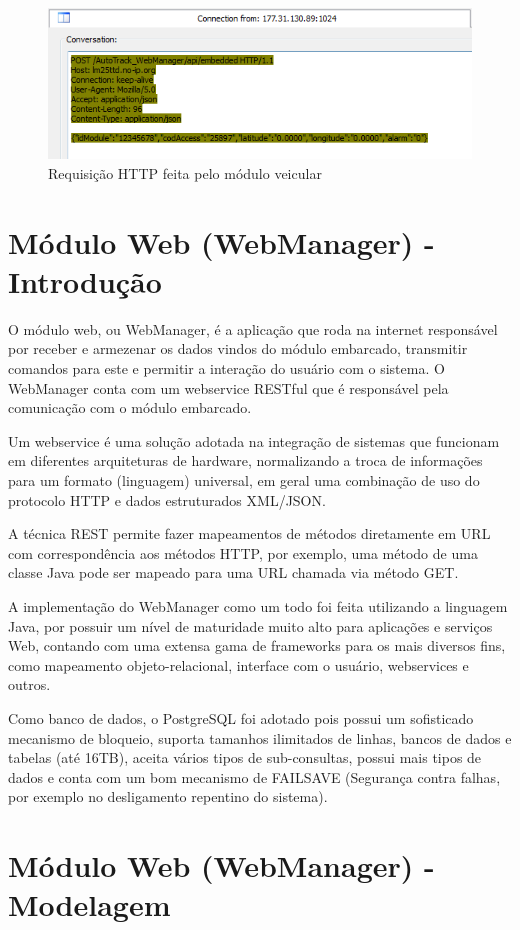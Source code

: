 \begin{figure}[!htb]
	\centering
	\includegraphics[width=7.00cm\textwidth]{figures/requisicao_post.png}
	\caption{Requisição HTTP feita pelo módulo veicular}
	\label{Figura 11}
\end{figure}

\section{Módulo Web (WebManager) - Introdução}

O módulo web, ou WebManager, é a aplicação que roda na internet responsável por receber e armezenar os dados vindos do módulo embarcado, transmitir comandos para este e permitir a interação do usuário com o sistema. O WebManager conta com um webservice RESTful que é responsável pela comunicação com o módulo embarcado.

Um webservice é uma solução adotada na integração de sistemas que funcionam em diferentes arquiteturas de hardware, normalizando a troca de informações para um formato (linguagem) universal, em geral uma combinação de uso do protocolo HTTP e dados estruturados XML/JSON. 

A técnica REST permite fazer mapeamentos de métodos diretamente em URL com correspondência aos métodos HTTP, por exemplo, uma método de uma classe Java pode ser mapeado para uma URL chamada via método GET.

A implementação do WebManager como um todo foi feita utilizando a linguagem Java, por possuir um nível de maturidade muito alto para aplicações e serviços Web, contando com uma extensa gama de frameworks para os mais diversos fins, como mapeamento objeto-relacional, interface com o usuário,  webservices e outros.

Como banco de dados, o PostgreSQL foi adotado  pois possui um sofisticado mecanismo de bloqueio, suporta tamanhos ilimitados de linhas, bancos de dados e tabelas (até 16TB), aceita vários tipos de sub-consultas, possui mais tipos de dados e conta com um bom mecanismo de FAILSAVE (Segurança contra falhas, por exemplo no desligamento repentino do sistema).

\section{Módulo Web (WebManager) - Modelagem}

